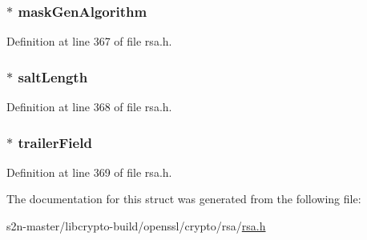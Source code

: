\subsubsection[{\texorpdfstring{mask\+Gen\+Algorithm}{maskGenAlgorithm}}]{ $\ast$ mask\+Gen\+Algorithm}\hypertarget{structrsa__pss__params__st_a2965bfd71458602306f15e308cfea1e6}{}\label{structrsa__pss__params__st_a2965bfd71458602306f15e308cfea1e6}


Definition at line 367 of file rsa.\+h.

\subsubsection[{\texorpdfstring{salt\+Length}{saltLength}}]{ $\ast$ salt\+Length}\hypertarget{structrsa__pss__params__st_aef20ac0efef108bdf491165ced153ce8}{}\label{structrsa__pss__params__st_aef20ac0efef108bdf491165ced153ce8}


Definition at line 368 of file rsa.\+h.

\subsubsection[{\texorpdfstring{trailer\+Field}{trailerField}}]{ $\ast$ trailer\+Field}\hypertarget{structrsa__pss__params__st_a4b4910dd91b98d46dcb40a29c54d4f29}{}\label{structrsa__pss__params__st_a4b4910dd91b98d46dcb40a29c54d4f29}


Definition at line 369 of file rsa.\+h.



The documentation for this struct was generated from the following file\+:\begin{DoxyCompactItemize}
\item 
s2n-\/master/libcrypto-\/build/openssl/crypto/rsa/\hyperlink{crypto_2rsa_2rsa_8h}{rsa.\+h}\end{DoxyCompactItemize}
